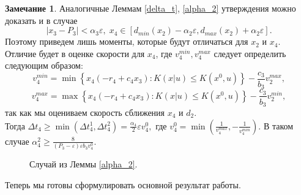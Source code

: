 \documentclass[11pt]{article}
\theoremstyle{definition}
\newtheorem{Remark_l}{Замечание}[lemma]
\newcommand\Set[2]{\left\{ #1 \colon #2 \right\}}
\begin{document}
\begin{Remark_l} 
\label{rem_2}
Аналогичные Леммам \ref{delta_t}, \ref{alpha_2} утверждения можно доказать и в случае 
$$|x_3 - P_3| < \alpha_3\varepsilon, \; x_4 \in [d_{min}(x_2) - \alpha_2\varepsilon, d_{max}(x_2) + \alpha_2\varepsilon].$$ Поэтому приведем лишь моменты, которые будут отличаться для $x_2$ и $x_4.$
Отличие будет в оценке скорости для $x_4$, где $v_4^{min}, v_4^{max}$ следует определить следующим образом: 
$$v_4^{min} = \min\Set{x_4(-r_4 + c_4x_3)}{K(x|u) \leqslant K(x^0,u)} - \frac{c_3}{b_3}v_2^{max},$$
$$v_4^{max} = \max\Set{x_4(-r_4 + c_4x_3)}{K(x|u) \leqslant K(x^0,u)} - \frac{c_3}{b_3}v_2^{min},$$
так как мы оцениваем скорость сближения $x_4$ и $d_2.$ \\
Тогда $\Delta t_4 \geqslant \min(\Delta t^1_4, \Delta t^2_4) = \frac{\alpha_4}{2}\varepsilon v_4^0,$ где 
$v_4^0 = \min(\frac{1}{v_4^{max}}, -\frac{1}{v_4^{min}}).$ В таком случае $\alpha^2_4 \geqslant \frac{8}{(P_3 - \varepsilon)\varepsilon b_3v_4^0}.$
\end{Remark_l}

\begin{figure}[h]
\caption{Случай из Леммы \ref{alpha_2}.}
\end{figure}
\FloatBarrier

Теперь мы готовы сформулировать основной результат работы.
\end{document}
